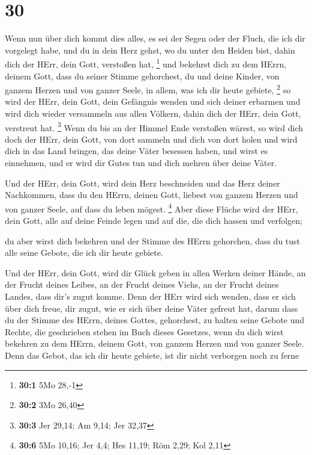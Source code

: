 \hypertarget{section-29}{%
\section{30}\label{section-29}}

 Wenn nun über dich kommt dies alles, es sei der Segen
oder der Fluch, die ich dir vorgelegt habe, und du in dein Herz gehst,
wo du unter den Heiden bist, dahin dich der HErr, dein Gott, verstoßen
hat, \footnote{\textbf{30:1} 5Mo 28,-1}  und bekehrst dich
zu dem HErrn, deinem Gott, dass du seiner Stimme gehorchest, du und
deine Kinder, von ganzem Herzen und von ganzer Seele, in allem, was ich
dir heute gebiete, \footnote{\textbf{30:2} 3Mo 26,40}  so
wird der HErr, dein Gott, dein Gefängnis wenden und sich deiner erbarmen
und wird dich wieder versammeln aus allen Völkern, dahin dich der HErr,
dein Gott, verstreut hat. \footnote{\textbf{30:3} Jer 29,14; Am 9,14;
  Jer 32,37}  Wenn du bis an der Himmel Ende verstoßen
wärest, so wird dich doch der HErr, dein Gott, von dort sammeln und dich
von dort holen  und wird dich in das Land bringen, das
deine Väter besessen haben, und wirst es einnehmen, und er wird dir
Gutes tun und dich mehren über deine Väter.

 Und der HErr, dein Gott, wird dein Herz beschneiden und
das Herz deiner Nachkommen, dass du den HErrn, deinen Gott, liebest von
ganzem Herzen und von ganzer Seele, auf dass du leben mögest.
\footnote{\textbf{30:6} 5Mo 10,16; Jer 4,4; Hes 11,19; Röm 2,29; Kol
  2,11}  Aber diese Flüche wird der HErr, dein Gott, alle
auf deine Feinde legen und auf die, die dich hassen und verfolgen;

 du aber wirst dich bekehren und der Stimme des HErrn
gehorchen, dass du tust alle seine Gebote, die ich dir heute gebiete.

 Und der HErr, dein Gott, wird dir Glück geben in allen
Werken deiner Hände, an der Frucht deines Leibes, an der Frucht deines
Viehs, an der Frucht deines Landes, dass dir's zugut komme. Denn der
HErr wird sich wenden, dass er sich über dich freue, dir zugut, wie er
sich über deine Väter gefreut hat,  darum dass du der
Stimme des HErrn, deines Gottes, gehorchest, zu halten seine Gebote und
Rechte, die geschrieben stehen im Buch dieses Gesetzes, wenn du dich
wirst bekehren zu dem HErrn, deinem Gott, von ganzem Herzen und von
ganzer Seele.  Denn das Gebot, das ich dir heute gebiete,
ist dir nicht verborgen noch zu ferne

